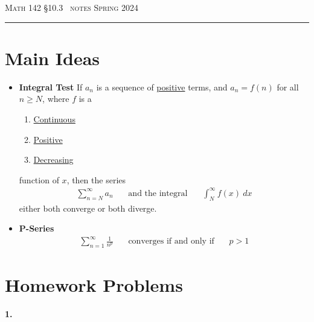 \documentclass{article}
\def\chapt{10.3}
\begin{document}
\noindent
{\scshape Math 142} \hfill {\scshape \S\chapt~ notes} \hfill {\scshape Spring 2024}

\smallskip

\hrule

\bigskip

\section*{Main Ideas}

\begin{itemize}
\item
\textbf{Integral Test}
If $a_n$ is a sequence of \underline{positive} terms,
and $a_n=f(n)$ for all $n\geq N$, where $f$ is a
\begin{enumerate}
\item
\underline{Continuous}
\item
\underline{Positive}
\item
\underline{Decreasing}
\end{enumerate}
function of $x$, then the series
\begin{gather*}
\sum_{n=N}^{\infty} a_n
~~~~~~~~\text{and the integral}~~~~~~~~
\int_N^{\infty}f(x)~dx
\end{gather*}
either both converge or both diverge.
\\

\item
\textbf{P-Series}
\\
\begin{gather*}
\sum_{n=1}^{\infty} \frac{1}{n^{p}}
~~~~~~~~\text{converges if and only if}~~~~~~~~
p>1
\end{gather*}

\end{itemize}

\newpage

%
%
%
%

\section*{Homework Problems}

\noindent
\textbf{
1.
}
\\
\end{document}
